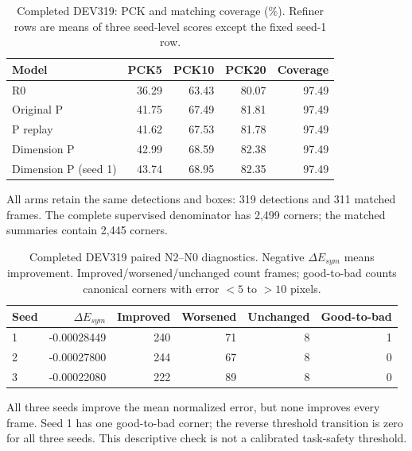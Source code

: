 \begin{table}[t]\centering
\caption{Completed DEV319: PCK and matching coverage (\%). Refiner rows are means of three seed-level scores except the fixed seed-1 row.}
\begin{tabular}{lrrrr}\toprule
Model & PCK5 & PCK10 & PCK20 & Coverage \\ \midrule
R0 & 36.29 & 63.43 & 80.07 & 97.49 \\
Original P & 41.75 & 67.49 & 81.81 & 97.49 \\
P replay & 41.62 & 67.53 & 81.78 & 97.49 \\
Dimension P & 42.99 & 68.59 & 82.38 & 97.49 \\
Dimension P (seed 1) & 43.74 & 68.95 & 82.35 & 97.49 \\
\bottomrule\end{tabular}
\label{tab:coverage}
\end{table}
All arms retain the same detections and boxes: 319 detections and 311 matched frames. The complete supervised denominator has 2,499 corners; the matched summaries contain 2,445 corners.
\begin{table}[t]\centering
\caption{Completed DEV319 paired N2--N0 diagnostics. Negative $\Delta E_{sym}$ means improvement. Improved/worsened/unchanged count frames; good-to-bad counts canonical corners with error $<5$ to $>10$ pixels.}
\begin{tabular}{lrrrrr}\toprule
Seed & $\Delta E_{sym}$ & Improved & Worsened & Unchanged & Good-to-bad \\ \midrule
1 & -0.00028449 & 240 & 71 & 8 & 1 \\
2 & -0.00027800 & 244 & 67 & 8 & 0 \\
3 & -0.00022080 & 222 & 89 & 8 & 0 \\
\bottomrule\end{tabular}
\label{tab:damage}
\end{table}
All three seeds improve the mean normalized error, but none improves every frame. Seed 1 has one good-to-bad corner; the reverse threshold transition is zero for all three seeds. This descriptive check is not a calibrated task-safety threshold.
